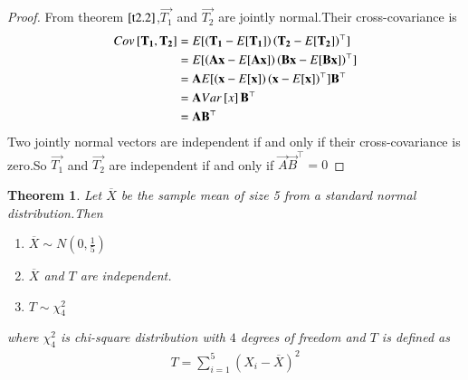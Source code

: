 \documentclass[journal,12pt,twocolumn]{IEEEtran}
\newtheorem{theorem}{Theorem}[section]
\begin{document}
\begin{proof}
From theorem $\ref{t2.2}$,$\vec{T_1}$ and $\vec{T_2}$ are jointly normal.Their cross-covariance is
\begin{align}
    Cov{}\left[\mathbf{T_1},\mathbf{T_2}\right]&=E[ \left(\mathbf{T_1}-E[ \mathbf{T_1} ]\right)\left(\mathbf{T_2}-E[ \mathbf{T_2} ]\right)^{\top} ]\\
    &=E[ \left(\mathbf{A}\mathbf{x}-E[ \mathbf{A}\mathbf{x} ]\right)\left(\mathbf{B}\mathbf{x}-E[ \mathbf{B}\mathbf{x} ]\right)^{\top} ]\\
    &=\mathbf{A}E[ \left(\mathbf{x}-E[ \mathbf{x} ]\right)\left(\mathbf{x}-E[ \mathbf{x} ]\right)^{\top} ]\mathbf{B}^{\top}\\
    &=\mathbf{A}Var{}\left[x\right]\mathbf{B}^{\top}\\
    &=\mathbf{A}\mathbf{B}^{\top}
\end{align}
Two jointly normal vectors are independent if and only if their cross-covariance is zero.So $\vec{T_1}$ and $\vec{T_2}$ are independent if and only if $\vec{A}\vec{B}^{\top}=0$
\end{proof}
\begin{theorem}
Let $\overline{X}$ be the sample mean of size 5 from a standard normal distribution.Then
\begin{enumerate}
    \item $\overline{X} \sim N(0,\frac{1}{5})$
    \item $\overline{X}$ and $T$ are independent.
    \item $T \sim \chi_{4}^2$
\end{enumerate} 
where $\chi_{4}^2$  is  chi-square distribution
with   $4$ degrees of freedom and $T$ is defined as
\begin{align}
    T=\sum_{i=1}^{5}(X_i-\overline{X})^2
\end{align}
\end{theorem}
\end{document}
